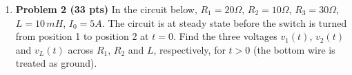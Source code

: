 \begin{enumerate}
\begin{comment}
    \htmladdimg{../../lectures/figures/Problems10.png}

  \item ({\bf 11 pts})
    In the figure above, it is know that $R=10\Omega$, $L=100\,mH$,
    and $C=500\,\mu F$, and the current through the loop is known to be
    $i(t)=\cos(100\,t)\,A$, find all four voltages $v_0(t)$, $v_1(t)$, 
    $v_2(t)$, and $v_3(t)$.

    {\bf Solution:} 
    $V_0=5$. $V_1=V_2=0$, $V_3=10$.

    \[
    \left\{\begin{array}{lll}
    v_1(t)=R i(t)=10\cos(100\,t)\\
    v_2(t)=Z_L i(t)=j\omega L i(t)=100\times 0.1 \cos(100\,t+\pi/2)=10\cos(100\,t+\pi/2)\\
    v_3(t)=Z_C i(t)=1/(j\omega C) i(t)=1/(100\times 500\times 10^{-6})\cos(100\,t)=20\cos(100,\,t-\pi/2)
    \end{array}\right.
    \]
    \[
    V_0=V_1+V_2+V_3=10+10\angle\pi/2+20\angle(-\pi/2)=10+10\angle(-\pi/2)
    \]
    \[
    v_0(t)=10\sqrt{2}\cos(100t-\pi/4)
    \]

  \item ({\bf 11 pts})
    The RMS values of the three currents through R, L, and C measured 
    by the three ammeters $A_1$, $A_2$, and $A_3$ are $I_1=4\,A$, $I_2=5\,A$, 
    and $I_3=2\,A$, respectively. Find the RMS value of the source current 
    $I_0$. If the AC voltage source is replaced by a DC current source 
    $I_0=1\,A$, Find the three currents $I_1$, $I_2$, and $I_3$ measured 
    respectively by ammeters $A_1$, $A_2$, and $A_3$.

    \htmladdimg{../../lectures/figures/Problems11.png}

    {\bf Solution:} $I_0=5$. $I_2=1$, $I_1=I_3=0$.
    

  \end{itemize}
\end{comment}

\item {\bf Problem 2 (33 pts)}
  In the circuit below, $R_1=20\Omega$, $R_2=10\Omega$, $R_3=30\Omega$,
  $L=10\,mH$, $I_0=5A$. The circuit is at steady state before the switch is 
  turned from position 1 to position 2 at $t=0$. Find the three voltages 
  $v_1(t)$, $v_2(t)$ and $v_L(t)$ across $R_1$, $R_2$ and $L$, respectively,
  for $t>0$ (the bottom wire is treated as ground).
  



\end{enumerate}
